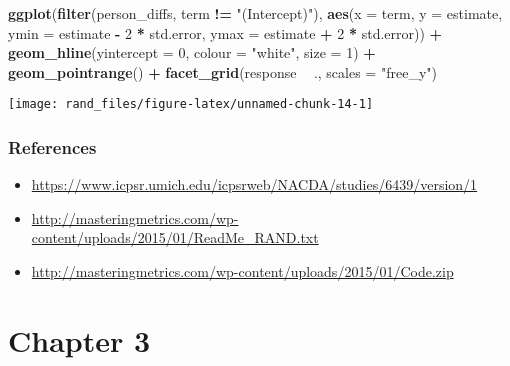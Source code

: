\documentclass[]{book}
\newenvironment{Shaded}{\begin{snugshade}}{\end{snugshade}}
\newcommand{\DataTypeTok}[1]{\textcolor[rgb]{0.13,0.29,0.53}{#1}}
\newcommand{\DecValTok}[1]{\textcolor[rgb]{0.00,0.00,0.81}{#1}}
\newcommand{\KeywordTok}[1]{\textcolor[rgb]{0.13,0.29,0.53}{\textbf{#1}}}
\newcommand{\NormalTok}[1]{#1}
\newcommand{\OperatorTok}[1]{\textcolor[rgb]{0.81,0.36,0.00}{\textbf{#1}}}
\newcommand{\StringTok}[1]{\textcolor[rgb]{0.31,0.60,0.02}{#1}}
\providecommand{\tightlist}{%
  \setlength{\itemsep}{0pt}\setlength{\parskip}{0pt}}
\theoremstyle{definition}
\theoremstyle{definition}
\theoremstyle{definition}
\theoremstyle{remark}
\begin{document}
\begin{Shaded}
\begin{Highlighting}[]
\KeywordTok{ggplot}\NormalTok{(}\KeywordTok{filter}\NormalTok{(person_diffs, term }\OperatorTok{!=}\StringTok{ "(Intercept)"}\NormalTok{),}
              \KeywordTok{aes}\NormalTok{(}\DataTypeTok{x =}\NormalTok{ term, }\DataTypeTok{y =}\NormalTok{ estimate,}
                  \DataTypeTok{ymin =}\NormalTok{ estimate }\OperatorTok{-}\StringTok{ }\DecValTok{2} \OperatorTok{*}\StringTok{ }\NormalTok{std.error,}
                  \DataTypeTok{ymax =}\NormalTok{ estimate }\OperatorTok{+}\StringTok{ }\DecValTok{2} \OperatorTok{*}\StringTok{ }\NormalTok{std.error)) }\OperatorTok{+}
\StringTok{  }\KeywordTok{geom_hline}\NormalTok{(}\DataTypeTok{yintercept =} \DecValTok{0}\NormalTok{, }\DataTypeTok{colour =} \StringTok{"white"}\NormalTok{, }\DataTypeTok{size =} \DecValTok{1}\NormalTok{) }\OperatorTok{+}
\StringTok{  }\KeywordTok{geom_pointrange}\NormalTok{() }\OperatorTok{+}
\StringTok{  }\KeywordTok{facet_grid}\NormalTok{(response }\OperatorTok{~}\StringTok{ }\NormalTok{., }\DataTypeTok{scales =} \StringTok{"free_y"}\NormalTok{)}
\end{Highlighting}
\end{Shaded}

\begin{center}\texttt{[image: rand\_files/figure-latex/unnamed-chunk-14-1]} \end{center}

\hypertarget{references-1}{%
\section*{References}\label{references-1}}

\begin{itemize}
\tightlist
\item
  \url{https://www.icpsr.umich.edu/icpsrweb/NACDA/studies/6439/version/1}
\item
  \url{http://masteringmetrics.com/wp-content/uploads/2015/01/ReadMe_RAND.txt}
\item
  \url{http://masteringmetrics.com/wp-content/uploads/2015/01/Code.zip}
\end{itemize}

\hypertarget{part-chapter-3}{%
\part{Chapter 3}\label{part-chapter-3}}
\end{document}
